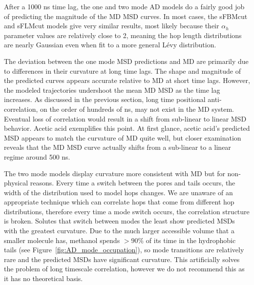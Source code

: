 \documentclass[aps,pre,preprint,groupedaddress]{revtex4-2}
\begin{document}
  After a 1000 ns time lag, the one and two mode AD models do a fairly good job of 
  predicting the magnitude of the MD MSD curves.
  In most cases, the sFBMcut
  and sFLMcut models give very similar results, most likely because their $\alpha_h$
  parameter values are relatively close to 2, meaning the hop length distributions
  are nearly Gaussian even when fit to a more general L\'evy distribution. 
  
  The deviation between the one mode MSD predictions and MD are primarily due
  to differences in their curvature at long time lags. The shape and magnitude of 
  the predicted curves appears accurate relative to MD at short time lags.  
  However, the modeled trajectories undershoot the mean MD MSD as the time lag increases. As 
  discussed in the previous section, long time positional anti-correlation, on
  the order of hundreds of ns, may not exist in the MD system. 
  Eventual loss of
  correlation would result in a shift from sub-linear to linear MSD behavior. 
  Acetic acid exemplifies this point. At first glance, acetic acid's predicted MSD appears to match the 
  curvature of MD quite well, but closer examination reveals that the MD MSD 
  curve actually shifts from a sub-linear to a linear regime around 500 ns.
  
  The two mode models display curvature more consistent with MD but for non-physical
  reasons. Every time a switch between the pores and tails occurs, the width of the
  distribution used to model hops changes. We are unaware of an appropriate technique which can 
  correlate hops that come from different hop distributions, therefore every 
  time a mode switch occurs, the correlation structure is broken. Solutes that
  switch between modes the least show predicted MSDs with the greatest curvature. 
  Due to the much larger accessible volume
  that a smaller molecule has,
  methanol spends $>90\%$ of its time
  in the hydrophobic tails (see Figure~\ref{fig:AD_mode_occupation}),
  so mode transitions are relatively rare and the predicted MSDs have significant 
  curvature. This artificially solves the problem of long timescale correlation, 
  however we do not recommend this as it 
  has no theoretical basis.
  
\end{document}
